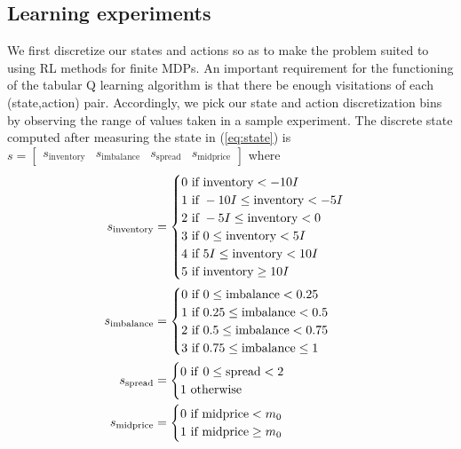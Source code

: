 \documentclass[sigconf]{acmart}
\begin{document}
\subsection{Learning experiments}
We first discretize our states and actions so as to make the problem suited to using RL methods for finite MDPs. An important requirement for the functioning of the tabular Q learning algorithm is that there be enough visitations of each (state,action) pair. Accordingly, we pick our state and action discretization bins by observing the range of values taken in a sample experiment. The discrete state computed after measuring the state in (\ref{eq:state}) is $s=\begin{bmatrix}
    s_{\mathrm{inventory}}&s_{\mathrm{imbalance}}&s_{\mathrm{spread}}&s_{\mathrm{midprice}}
    \end{bmatrix}$ where \begin{align*}
s_{\mathrm{inventory}}&=\begin{cases}0\textnormal{ if }\mathrm{inventory}<-10I\\1\textnormal{ if }-10I\leq\mathrm{inventory}<-5I\\2\textnormal{ if }-5I\leq\mathrm{inventory}<0\\3\textnormal{ if }0\leq\mathrm{inventory}<5I\\4\textnormal{ if }5I\leq\mathrm{inventory}<10I\\5\textnormal{ if }\mathrm{inventory}\geq10I\end{cases}\\
    s_{\mathrm{imbalance}}&=\begin{cases}0\textnormal{ if }0\leq\mathrm{imbalance}<0.25\\1\textnormal{ if }0.25\leq\mathrm{imbalance}<0.5\\2\textnormal{ if }0.5\leq\mathrm{imbalance}<0.75\\3\textnormal{ if }0.75\leq\mathrm{imbalance}\leq1\end{cases}\\
    s_{\mathrm{spread}}&=\begin{cases}0\ \mathrm{if}\ 0\leq\mathrm{spread}<2\\1\ \mathrm{otherwise}\end{cases}\\
    s_{\mathrm{midprice}}&=\begin{cases}0\textnormal{ if }\mathrm{midprice}<m_0\\1\textnormal{ if }\mathrm{midprice}\geq m_0\end{cases}
\end{align*}
\end{document}

